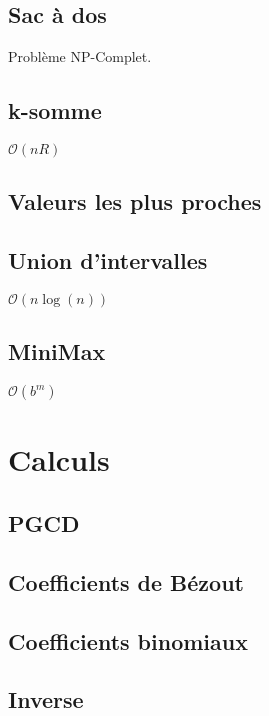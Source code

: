 \documentclass[8pt]{article}
\begin{document}
        \subsection{Sac à dos}
        Problème NP-Complet.
        {\scriptsize}
        \subsection{k-somme}
        $\mathcal{O}(nR)$
        {\scriptsize}
        \subsection{Valeurs les plus proches}
        {\scriptsize}
        \subsection{Union d'intervalles}
        $\mathcal{O}(n \log(n))$
        {\scriptsize}
        \subsection{MiniMax}
        $\mathcal{O}(b^m)$
        {\scriptsize}
    \section{Calculs}
        \subsection{PGCD}
        {\scriptsize}
        \subsection{Coefficients de Bézout}
        {\scriptsize}
        \subsection{Coefficients binomiaux}
        {\scriptsize}
        \subsection{Inverse}
        {\scriptsize}
\end{document}
